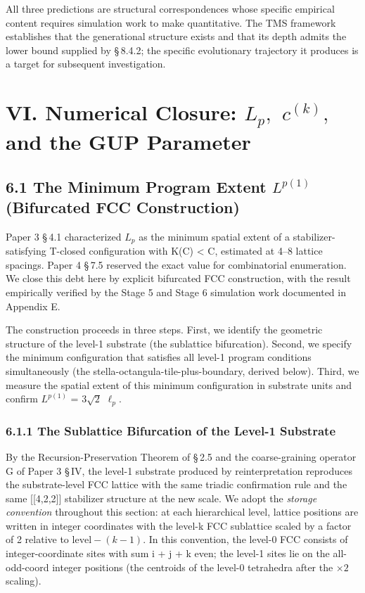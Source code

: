 \documentclass[11pt,oneside]{report}
\theoremstyle{definition}
\theoremstyle{remark}
\begin{document}
All three predictions are structural correspondences whose specific
empirical content requires simulation work to make quantitative. The TMS
framework establishes that the generational structure exists and that
its depth admits the lower bound supplied by \S\,8.4.2; the specific
evolutionary trajectory it produces is a target for subsequent
investigation.

\section*{VI. Numerical Closure: \ensuremath{L_{p},} \ensuremath{c^{(k)},} and the GUP Parameter}

\subsection*{6.1 The Minimum Program Extent \ensuremath{L^{p(1)}} (Bifurcated FCC Construction)}

Paper 3 \S\,4.1 characterized \ensuremath{L_{p}} as the minimum spatial extent of a
stabilizer-satisfying T-closed configuration with K(C) \textless{}
\textbar C\textbar, estimated at 4--8 lattice spacings. Paper 4 \S\,7.5
reserved the exact value for combinatorial enumeration. We close this
debt here by explicit bifurcated FCC construction, with the result
empirically verified by the Stage 5 and Stage 6 simulation work
documented in Appendix E.

The construction proceeds in three steps. First, we identify the
geometric structure of the level-1 substrate (the sublattice
bifurcation). Second, we specify the minimum configuration that
satisfies all level-1 program conditions simultaneously (the
stella-octangula-tile-plus-boundary, derived below). Third, we measure
the spatial extent of this minimum configuration in substrate units and
confirm \ensuremath{L^{p(1)}} = \ensuremath{3\sqrt{2}} \ensuremath{\ell_{p}.}

\subsubsection*{6.1.1 The Sublattice Bifurcation of the Level-1 Substrate}

By the Recursion-Preservation Theorem of \S\,2.5 and the coarse-graining
operator G of Paper 3 \S\,IV, the level-1 substrate produced by
reinterpretation reproduces the substrate-level FCC lattice with the
same triadic confirmation rule and the same [[4,2,2]] stabilizer
structure at the new scale. We adopt the \emph{storage convention}
throughout this section: at each hierarchical level, lattice positions
are written in integer coordinates with the level-k FCC sublattice
scaled by a factor of 2 relative to \ensuremath{\text{level}-(k-1).} In this convention, the
level-0 FCC consists of integer-coordinate sites with sum i + j + k
even; the level-1 sites lie on the all-odd-coord integer positions (the
centroids of the level-0 tetrahedra after the \ensuremath{\times 2} scaling).
\end{document}
